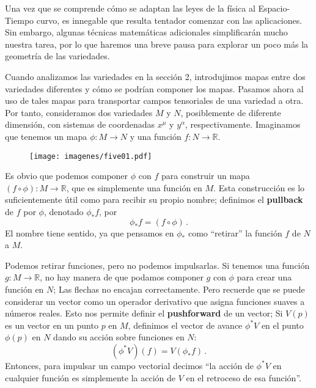 \documentclass[11pt,b5paper,openany,twoside]{book}
\newcommand{\R}{\mathbb{R}}
\begin{document}
Una vez que se comprende cómo se adaptan las leyes de la física al Espacio-Tiempo curvo, es innegable que resulta tentador comenzar con las aplicaciones.
Sin embargo, algunas técnicas matemáticas adicionales simplificarán mucho nuestra tarea, por lo que haremos una breve pausa para explorar un poco más la geometría de las variedades.

Cuando analizamos las variedades en la sección 2, introdujimos mapas entre dos variedades diferentes y cómo se podrían componer los mapas.
Pasamos ahora al uso de tales mapas para transportar campos tensoriales de una variedad a otra.
Por tanto, consideramos dos variedades $M$ y $N$, posiblemente de diferente dimensión, con sistemas de coordenadas $x^\mu$ y $y^\alpha$, respectivamente.
Imaginamos que tenemos un mapa $\phi:M\rightarrow N$ y una función $f:N\rightarrow \R$.

\begin{figure}[h]
\centering
\texttt{[image: imagenes/five01.pdf]}
\end{figure}

\noindent
Es obvio que podemos componer $\phi$ con $f$ para construir un mapa $(f\circ\phi):M\rightarrow\R$, que es simplemente una función en $M$.
Esta construcción es lo suficientemente útil como para recibir su propio nombre; definimos el {\bf pullback} de $f$ por $\phi$, denotado $\phi_*f$, por
\begin{equation}
\phi_* f = (f\circ\phi)\,.\label{5.1}
\end{equation}
El nombre tiene sentido, ya que pensamos en $\phi_*$ como ``retirar'' la función $f$ de $N$ a $M$.

Podemos retirar funciones, pero no podemos impulsarlas.
Si tenemos una función $g:M\rightarrow\R$, no hay manera de que podamos componer $g$ con $\phi$ para crear una función en $N$; Las flechas no encajan correctamente.
Pero recuerde que se puede considerar un vector como un operador derivativo que asigna funciones suaves a números reales.
Esto nos permite definir el {\bf pushforward} de un vector; Si $V(p)$ es un vector en un punto $p$ en $M$, definimos el vector de avance $\phi^*V$ en el punto $\phi(p)$ en $N$ dando su acción sobre funciones en $N$:
\begin{equation}
(\phi^*V)(f) = V(\phi_*f)\,.\label{5.2}
\end{equation}
Entonces, para impulsar un campo vectorial decimos ``la acción de $\phi^*V$ en cualquier función es simplemente la acción de $V$ en el retroceso de esa función''.
\end{document}
